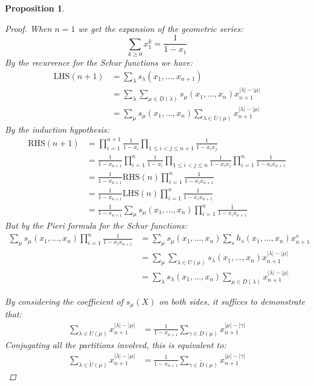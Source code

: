 \documentclass[12pt,dvips]{amsart}
\newtheorem{proposition}{Proposition}[section]
\begin{document}
\begin{proposition}
\begin{proof}
When $n=1$ we get the expansion of the geometric series:
$$ \sum_{k \geq 0} x_1^k = \frac{1}{1-x_1} $$
By the recurrence for the Schur functions we have:
\begin{align*}
\text{LHS}(n+1) & = \sum_\lambda s_\lambda(x_1, \ldots, x_{n+1}) \\
& =  \sum_\lambda  \sum_{\mu \in D(\lambda)} 
s_\mu(x_1, \ldots, x_{n}) x_{n+1}^{|\lambda| - |\mu|} \\
& = \sum_\mu s_\mu(x_1, \ldots, x_{n}) 
\sum_{\lambda \in U(\mu)} x_{n+1}^{|\lambda| - |\mu|} %
\end{align*}
By the induction hypothesis:
\begin{align*}
\text{RHS}(n+1) & = 	\prod_{i=1}^{n+1} \frac{1}{1-x_i} \prod_{1 \leq i<j \leq n+1} \frac{1}{1-x_i x_j} \\
& =  \frac{1}{1-x_{n+1}} 
 \prod_{i=1}^{n} \frac{1}{1-x_i} \prod_{1 \leq i<j \leq n} \frac{1}{1-x_i x_j} \prod_{i=1}^{n} \frac{1}{1-x_i x_{n+1}} \\
& =  \frac{1}{1-x_{n+1}} 
 \text{RHS}(n) \prod_{i=1}^{n} \frac{1}{1-x_i x_{n+1}} \\
& =  \frac{1}{1-x_{n+1}} 
\text{LHS}(n)
\prod_{i=1}^{n} \frac{1}{1-x_i x_{n+1} } \\
& =  \frac{1}{1-x_{n+1}}  
\sum_\mu s_\mu(x_1, \ldots, x_{n}) \prod_{i=1}^{n}\frac{1}{1-x_i x_{n+1} }
\end{align*}
But by the Pieri formula for the Schur functions:	
\begin{align*}
\sum_\mu s_\mu(x_1, \ldots, x_{n}) \prod_{i=1}^{n}\frac{1}{1-x_i x_{n+1} } & =  
\sum_\mu s_\mu(x_1, \ldots, x_{n}) 
\sum_s h_s(x_1, \ldots, x_{n}) x_{n+1}^s \\
& =  \sum_\mu  \sum_{\lambda \in U(\mu)}
s_\lambda(x_1, \ldots, x_{n}) x_{n+1}^{|\lambda| - |\mu|} \\
& =  \sum_\lambda s_\lambda(x_1, \ldots, x_{n}) 
\sum_{\mu \in D(\lambda)} x_{n+1}^{|\lambda| - |\mu|} %
\end{align*}

\bigskip\bigskip
\noindent
By considering the coefficient of $s_\mu(X)$ on both sides, it suffices to demonstrate that:
\begin{align}\label{part1}
\sum_{\lambda \in U(\mu)} x_{n+1}^{|\lambda| - |\mu|}
& =  \frac{1}{1-x_{n+1}} \sum_{\gamma \in D(\mu)} x_{n+1}^{|\mu| - |\gamma|}
\end{align}
Conjugating all the partitions involved, this is equivalent to:
\begin{align}\label{part2}
\sum_{\lambda \in \tilde{U}(\mu)} x_{n+1}^{|\lambda| - |\mu|}
& =  \frac{1}{1-x_{n+1}} \sum_{\gamma \in \tilde{D}(\mu)} x_{n+1}^{|\mu| - |\gamma|}
\end{align}


\end{proof}
\end{proposition}
\end{document}
